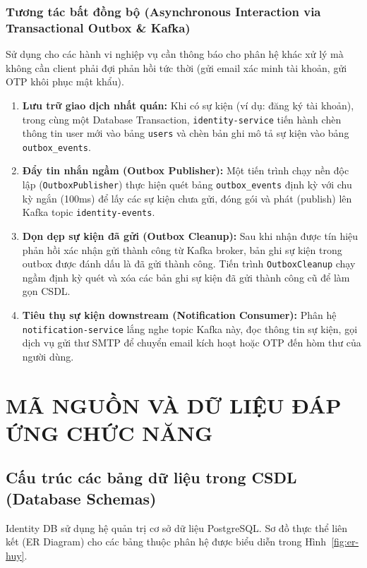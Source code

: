 \documentclass[14pt,a4paper,oneside]{extreport}
\begin{document}
\subsection{Tương tác bất đồng bộ (Asynchronous Interaction via Transactional Outbox \& Kafka)}
Sử dụng cho các hành vi nghiệp vụ cần thông báo cho phân hệ khác xử lý mà không cần client phải đợi phản hồi tức thời (gửi email xác minh tài khoản, gửi OTP khôi phục mật khẩu).
\begin{enumerate}[leftmargin=1.5cm]
  \item \textbf{Lưu trữ giao dịch nhất quán:} Khi có sự kiện (ví dụ: đăng ký tài khoản), trong cùng một Database Transaction, \texttt{identity-\allowbreak service} tiến hành chèn thông tin user mới vào bảng \texttt{users} và chèn bản ghi mô tả sự kiện vào bảng \texttt{outbox\allowbreak\_events}.
  \item \textbf{Đẩy tin nhắn ngầm (Outbox Publisher):} Một tiến trình chạy nền độc lập (\texttt{OutboxPublisher}) thực hiện quét bảng \texttt{outbox\allowbreak\_events} định kỳ với chu kỳ ngắn (100ms) để lấy các sự kiện chưa gửi, đóng gói và phát (publish) lên Kafka topic \texttt{identity-\allowbreak events}.
  \item \textbf{Dọn dẹp sự kiện đã gửi (Outbox Cleanup):} Sau khi nhận được tín hiệu phản hồi xác nhận gửi thành công từ Kafka broker, bản ghi sự kiện trong outbox được đánh dấu là đã gửi thành công. Tiến trình \texttt{OutboxCleanup} chạy ngầm định kỳ quét và xóa các bản ghi sự kiện đã gửi thành công cũ để làm gọn CSDL.
  \item \textbf{Tiêu thụ sự kiện downstream (Notification Consumer):} Phân hệ \texttt{notification-\allowbreak service} lắng nghe topic Kafka này, đọc thông tin sự kiện, gọi dịch vụ gửi thư SMTP để chuyển email kích hoạt hoặc OTP đến hòm thư của người dùng.
\end{enumerate}

\chapter{MÃ NGUỒN VÀ DỮ LIỆU ĐÁP ỨNG CHỨC NĂNG}
\label{chap:code-va-du-lieu}

\section{Cấu trúc các bảng dữ liệu trong CSDL (Database Schemas)}
Identity DB sử dụng hệ quản trị cơ sở dữ liệu PostgreSQL. Sơ đồ thực thể liên kết (ER Diagram) cho các bảng thuộc phân hệ được biểu diễn trong Hình~\ref{fig:er-huy}.
\end{document}
